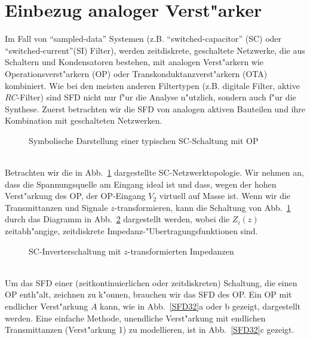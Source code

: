 \newpage\section{Einbezug analoger Verst"arker}
Im Fall von ``sampled-data'' Systemen (z.B.  ``switched-capacitor''
(SC) oder ``switched-current''(SI) Filter), werden
zeitdiskrete, geschaltete Netzwerke, die aus Schaltern und
Kondensatoren bestehen, mit analogen Verst"arkern wie
Operationsverst"arkern (OP) oder Transkonduktanzverst"arkern
(OTA) kombiniert. Wie bei den meisten anderen Filtertypen
(z.B. digitale Filter, aktive $RC$-Filter) sind SFD nicht nur f"ur die
Analyse n"utzlich, sondern auch f"ur die Synthese. Zuerst betrachten
wir die SFD von analogen aktiven
Bauteilen und ihre Kombination mit geschalteten Netzwerken.
\begin{figure}[htb!]
\vspace*{-3mm}\begin{center}
  \caption{Symbolische Darstellung einer typischen SC-Schaltung mit OP}\label{SFD30}
\end{center}
\vspace*{-7mm}
\end{figure}\\
\nit Betrachten wir die in Abb.~\ref{SFD30} dargestellte
SC-Netzwerktopologie.  Wir nehmen an, dass die Spannungsquelle am
Eingang ideal ist und dass, wegen der hohen Verst"arkung des OP, der
OP-Eingang $V_2$ virtuell auf Masse ist. Wenn wir die Transmittanzen
und Signale $z$-transformieren, kann die Schaltung von
Abb.~\ref{SFD30} durch das Diagramm in Abb.~\ref{SFD31} dargestellt
werden, wobei die $Z_i(z)$ zeitabh"angige, zeitdiskrete
Impedanz-"Ubertragungsfunktionen sind.
\begin{figure}[htb!]
\begin{center}
  \caption{SC-Inverterschaltung mit $z$-transformierten
Impedanzen}\label{SFD31}
\end{center}
\vspace*{-7mm}
\end{figure}\\
\nit Um das SFD einer (zeitkontinuierlichen oder zeitdiskreten)
Schaltung, die einen OP enth"alt, zeichnen zu k"onnen, brauchen wir
das SFD des OP. Ein OP mit endlicher Verst"arkung $A$ kann, wie in
Abb.~\ref{SFD32}a oder b gezeigt, dargestellt werden. Eine einfache
Methode, unendliche Verst"arkung mit endlichen Transmittanzen
(Verst"arkung 1) zu modellieren, ist in Abb.~\ref{SFD32}c gezeigt.
